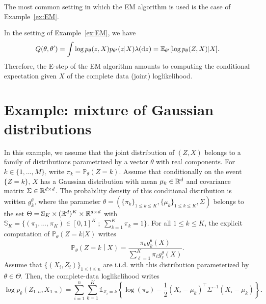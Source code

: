 \documentclass[english,graybox,envcountchap,envcountsame,sectrefs,shortlabels]{svmono}
\theoremstyle{style}
\newcommand{\eqsp}{}
\begin{document}
The most common setting in which the EM algorithm is used is the case of Example~\ref{ex:EM}. 

\begin{example}
\label{ex:EM:alg}
In the setting of Example~\ref{ex:EM}, we have
$$
Q(\theta,\theta') = \int \log p_\theta(z,X)p_{\theta'}(z|X)\lambda(\rmd z) = \mathbb{E}_{\theta'}[\log p_\theta(Z,X)|X]\eqsp.
$$
Therefore, the E-step of the EM algorithm amounts to computing the conditional expectation given $X$ of the complete data (joint) loglikelihood.
\end{example}

\section{Example: mixture of Gaussian distributions}
In this example, we assume that the joint distribution of $(Z,X)$ belongs to a family of distributions parametrized by a vector $\theta$ with real components. For $k\in\{1,\ldots,M\}$, write $\pi_k = \mathbb{P}_\theta(Z = k)$. Assume that conditionally on the event $\{Z = k\}$, $X$ has a Gaussian distribution with mean $\mu_k \in\mathbb{R}^d$ and covariance matrix $\Sigma\in \mathbb{R}^{d\times d}$. The probability density of this conditional distribution is written $g_k^\theta$, where the parameter $\theta=(\{\pi_k\}_{1\leq k \leq K}, \{\mu_k\}_{1\leq k \leq K}, \Sigma)$ belongs to the set $\Theta= \mathbb{S}_K \times (\mathbb{R}^d)^K  \times \mathbb{R}^{d \times d}$ with $\mathbb{S}_K = \{(\pi_1,\ldots,\pi_K)\in[0,1]^K\;;\; \sum_{k=1}^K \pi_k=1\}$. For all $1\leq k \leq K$, the explicit computation of $\mathbb{P}_\theta(Z=k | X)$ writes
$$
\mathbb{P}_\theta\left(Z=k\middle | X\right) = \frac{\pi_kg^{\theta}_k(X)}{\sum_{\ell=1}^{K}\pi_\ell g^{\theta}_\ell(X)}\eqsp. %
$$
Assume that $\{(X_i,Z_i)\}_{1\leq i\leq n}$ are i.i.d. with this distribution parameterized by $\theta\in\Theta$. Then, the complete-data loglikelihood writes
$$
\log p_\theta (Z_{1:n},X_{1:n}) = \sum_{i=1}^n \sum_{k=1}^K \mathds{1}_{Z_i = k}\left\{\log(\pi_k) -\frac{1}{2}(X_i - \mu_{k})^\top \Sigma^{-1}(X_i - \mu_{k})  \right\}\eqsp.%
$$
\end{document}
